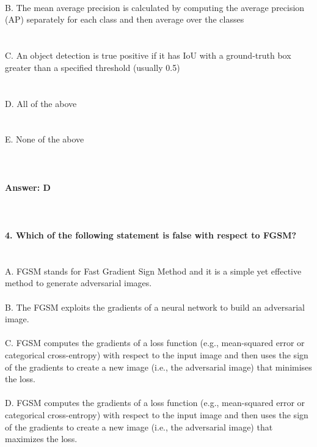 \documentclass[prl,twocolumn,showpacs,preprintnumbers,superscriptaddress]{revtex4}
\theoremstyle{plain}
\theoremstyle{definition}
\begin{document}
\begin{widetext}
\\
\\
\\
B. The mean average precision is calculated by computing the average precision (AP) separately for each class and then average over the classes
\\
\\
\\
C. An object detection is true positive if it has IoU with a ground-truth box greater than a specified threshold (usually 0.5)
\\
\\
\\
D. All of the above
\\
\\
\\
E. None of the above
\\
\\
\\
\\
\textbf{Answer: D}
\\
\\
\\
\\
\textbf{4. Which of the following statement is false with respect to FGSM?}
\\
\\
\\
A. FGSM stands for Fast Gradient Sign Method and it is a simple yet effective method to generate adversarial images.
\\
\\
B. The FGSM exploits the gradients of a neural network to build an adversarial image.
\\
\\
C. FGSM computes the gradients of a loss function (e.g., mean-squared error or categorical cross-entropy) with respect to the input image and then uses the sign of the gradients to create a new image (i.e., the adversarial image) that minimises the loss.
\\
\\
D. FGSM computes the gradients of a loss function (e.g., mean-squared error or categorical cross-entropy) with respect to the input image and then uses the sign of the gradients to create a new image (i.e., the adversarial image) that maximizes the loss.
\\
\\

\end{widetext}
\end{document}
